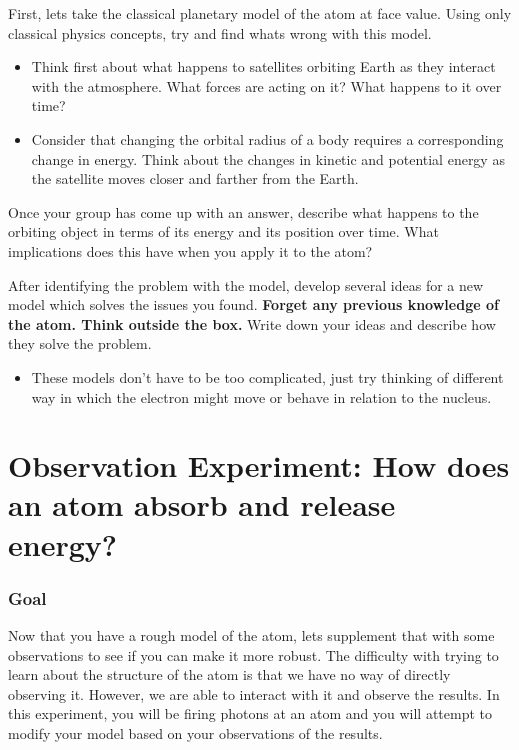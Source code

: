 \begin{steps} 
	\item First, lets take the classical planetary model of the atom at face value. Using only classical physics concepts, try and find whats wrong with this model. 
	\begin{itemize} 
		\item Think first about what happens to satellites orbiting Earth as they interact with the atmosphere. What forces are acting on it? What happens to it over time?
		
		\item Consider that changing the orbital radius of a body requires a corresponding change in energy. Think about the changes in kinetic and potential energy as the satellite moves closer and farther from the Earth. 
	\end{itemize}
	\item Once your group has come up with an answer, describe what happens to the orbiting object in terms of its energy and its position over time. What implications does this have when you apply it to the atom?
	
	\item After identifying the problem with the model, develop several ideas for a new model which solves the issues you found. \textbf{Forget any previous knowledge of the atom. Think outside the box.} Write down your ideas and describe how they solve the problem. 
	\begin{itemize}
		\item These models don't have to be too complicated, just try thinking of different way in which the electron might move or behave in relation to the nucleus.
	\end{itemize} 
\end{steps}

\section{Observation Experiment: How does an atom absorb and release energy?} %

\subsubsection{Goal}
Now that you have a rough model of the atom, lets supplement that with some observations to see if you can make it more robust. The difficulty with trying to learn about the structure of the atom is that we have no way of directly observing it. However, we are able to interact with it and observe the results. In this experiment, you will be firing photons at an atom and you will attempt to modify your model based on your observations of the results. 
